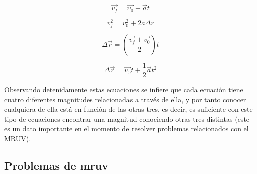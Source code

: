 \documentclass[a5paper,pagesize,10pt,bibtotoc,pointlessnumbers,
normalheadings,DIV=9,fleqn,x11names,table,twoside=false]{scrbook}
\begin{document}
\begin{equation}
\vec{v_f} = \vec{v_0} + \vec{a}t 
\end{equation}

\begin{equation}
 v_f^2 = v_0^2+2a\Delta r
\end{equation}

\begin{equation}
 \Delta \vec{r} = (\frac{\vec{v_f}+\vec{v_0}}{2})t
\end{equation}

\begin{equation}
 \Delta \vec{r} = \vec{v_0}t + \frac{1}{2}\vec{a}t^2
\end{equation}
 
Observando detenidamente estas ecuaciones se infiere que cada ecuación tiene cuatro diferentes magnitudes relacionadas 
a través de ella, y por tanto conocer cualquiera de ella está en función de las otras tres, es decir, es suficiente con 
este tipo de ecuaciones encontrar una magnitud conociendo otras tres distintas (este es un dato importante en el momento de 
resolver problemas relacionados con el MRUV).

\subsection{Problemas de mruv}
\end{document}
